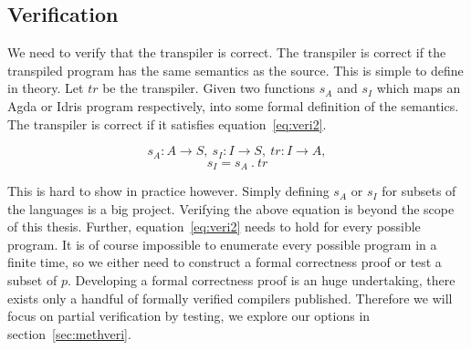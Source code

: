 \subsection{Verification}\label{sec:veri}

We need to verify that the transpiler is correct. The transpiler is correct if
the transpiled program has the same semantics as the source.
This is simple to define in theory.
Let $tr$ be the transpiler.
Given two functions $s_A$ and $s_I$ which maps an Agda or Idris program
respectively, into some formal definition of the semantics.
The transpiler is correct if it satisfies equation~\ref{eq:veri2}.

\begin{equation} \label{eq:veri1}
  s_A : A \rightarrow S,
  \ s_I : I \rightarrow S,
  \ tr : I \rightarrow A,
\end{equation}
\begin{equation} \label{eq:veri2}
  s_I = s_A\ .\ tr
\end{equation}

This is hard to show in practice however.
Simply defining $s_A$ or $s_I$ for subsets of the languages is a big project.
Verifying the above equation is beyond the scope of this thesis.
Further, equation~\ref{eq:veri2} needs to hold for every possible program.  It
is of course impossible to enumerate every possible program in a finite time,
so we either need to construct a formal correctness proof or test a subset of
$p$.  Developing a formal correctness proof is an huge
undertaking, there exists only a handful of formally verified compilers
published.
Therefore we will focus on partial verification by testing, we explore our
options in section~\ref{sec:methveri}.

